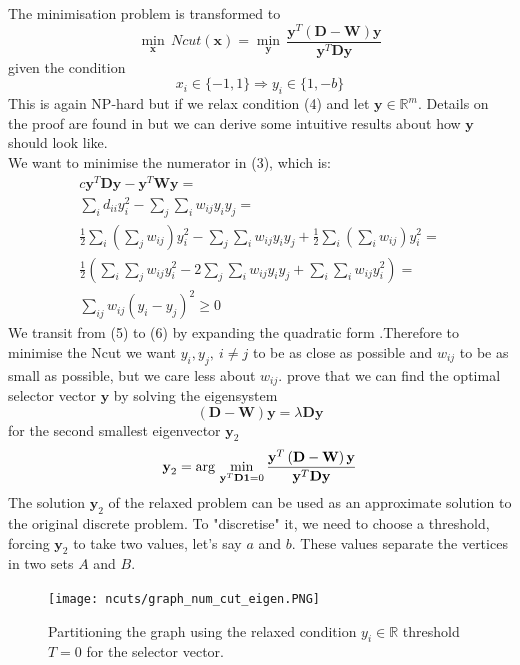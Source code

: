 \documentclass[a4paper]{article}
\begin{document}
The minimisation problem is transformed to
\[
\underset{\mathbf{x}}{\mathop{\min }}\,Ncut\left( \mathbf{x} \right)=\underset{\mathbf{y}}{\mathop{\min }}\,\frac{{{\mathbf{y}}^{T}}\left( \mathbf{D}-\mathbf{W} \right)\mathbf{y}}{{{\mathbf{y}}^{T}}\mathbf{Dy}} \tag{3}
\]
given the condition
\[
x_i\in \{-1,1\} \Rightarrow y_i\in \{1,-b \}\tag{4}
\]
This is again NP-hard but if we relax condition (4) and let $\textbf{y}\in \mathbb{R}^m$. Details on the proof are found in \TODO[ref] but we can derive some intuitive results about how $\textbf{y}$ should look like.\\
We want to minimise the numerator in (3), which is:
\begin{align}{c}
\textbf{y}^T\textbf{Dy} - \textbf{y}^T\textbf{Wy} =  \tag{5} \\ 
\sum\limits_{i}{d_{ii}y_i^2} - \sum\limits_j \sum\limits_i{w_{ij}y_iy_j} = \tag{6} \\
\frac{1}{2}\sum\limits_{i}{\left( \sum\limits_{j}{{{w}_{ij}}} \right)}y_{i}^{2} - 
\sum\limits_j \sum\limits_i{w_{ij}y_iy_j}
+\frac{1}{2}\sum\limits_{i}{\left( \sum\limits_{i}{{{w}_{ij}}} \right)}y_{i}^{2}=\tag{7} \\
\frac{1}{2}\left( \sum\limits_{i}{ \sum\limits_{j}{{{w}_{ij}}} }y_{i}^{2} - 
2\sum\limits_j \sum\limits_i{w_{ij}y_iy_j}
+\sum\limits_{i}{ \sum\limits_{i}{{{w}_{ij}}} }y_{i}^{2}\right) =\tag{8} \\
\sum\limits_{ij}w_{ij}\left(y_i - y_j \right)^2 \geq 0 \tag{9}
\end{align}
We transit from (5) to (6) by expanding the quadratic form \TODO[ref].Therefore to minimise the Ncut we want $y_i,y_j,\ i\neq j$ to be as close as possible and $w_{ij}$ to be as small as possible, but we care less about $w_{ij}$.
\TODO[ref] prove that we can find the optimal selector vector $\textbf{y}$ by solving the eigensystem
\begin{equation}
    (\textbf{D}-\textbf{W})\textbf{y}=\lambda \textbf{Dy}
\end{equation}
for the second smallest eigenvector $\textbf{y}_2$
\begin{equation}
    \textbf{y}_2 = \textup{arg}\ \underset{{{\mathbf{y}}^{T}}\mathbf{D1}=0}{\mathop{\min }}\,\frac{{{\mathbf{y}}^{T}}\left( \mathbf{D}-\mathbf{W} \right)\mathbf{y}}{{{\mathbf{y}}^{T}}\mathbf{Dy}}
\end{equation}
The solution $\textbf{y}_2$ of the relaxed problem can be used as an approximate solution to the original discrete problem. To "discretise" it, we need to choose a threshold, forcing $\textbf{y}_2$ to take two values, let's say $a$ and $b$. These values separate the vertices in two sets $A$ and $B$.
\begin{figure}[H]
	\centering %
    	\texttt{[image: ncuts/graph\_num\_cut\_eigen.PNG]}
    \caption{Partitioning the graph using the relaxed condition $y_i\in \mathbb{R} $ threshold $T=0$ for the selector vector.}
\end{figure}
\end{document}
